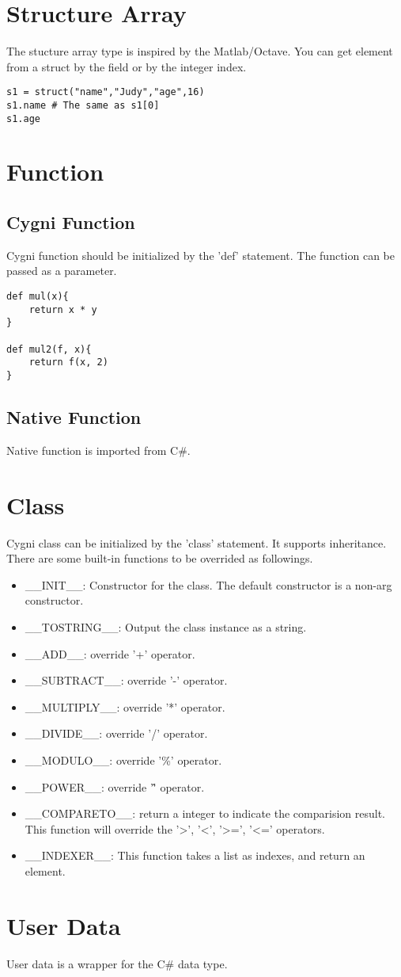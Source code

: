\section{Structure Array}
The stucture array type is inspired by the Matlab/Octave. You can get element from a struct by the field or by the integer index.
\begin{lstlisting}
s1 = struct("name","Judy","age",16)
s1.name # The same as s1[0]
s1.age
\end{lstlisting}

\section{Function}
\subsection{Cygni Function}
Cygni function should be initialized by the 'def' statement. The function can be passed as a parameter. 
\begin{lstlisting}
def mul(x){
	return x * y
}

def mul2(f, x){
	return f(x, 2)
}
\end{lstlisting}

\subsection{Native Function}
Native function is imported from C\#.

\section{Class}
Cygni class can be initialized by the 'class' statement. It supports inheritance. There are some built-in functions to be overrided as followings.
\begin{itemize}
	\item \_\_INIT\_\_: Constructor for the class. The default constructor is a non-arg constructor.
	\item \_\_TOSTRING\_\_: Output the class instance as a string.
	\item \_\_ADD\_\_: override '+' operator.
	\item \_\_SUBTRACT\_\_: override '-' operator.
	\item \_\_MULTIPLY\_\_: override '*' operator.
	\item \_\_DIVIDE\_\_: override '/' operator.
	\item \_\_MODULO\_\_: override '\%' operator.
	\item \_\_POWER\_\_: override '\^' operator.
	\item \_\_COMPARETO\_\_: return a integer to indicate the comparision result. This function will override the '>', '<', '>=', '<=' operators.
	\item \_\_INDEXER\_\_: This function takes a list as indexes, and return an element.
\end{itemize}

\section{User Data}
User data is a wrapper for the C\# data type.
